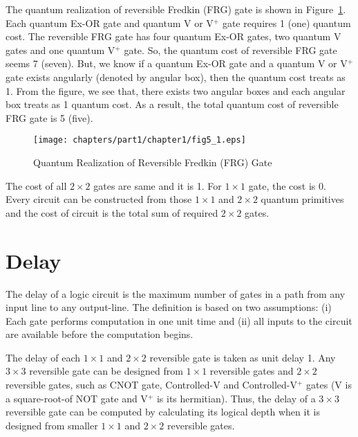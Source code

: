 \begin{example}\textnormal{
The quantum realization of reversible Fredkin (FRG) gate is shown in  Figure~\ref{fig:p1_c1_fig5_1}. Each quantum Ex-OR gate and quantum V or V$^+$ gate requires 1 (one) quantum cost. The reversible FRG gate has four quantum Ex-OR gates, two quantum V gates and one quantum V$^+$ gate. So, the quantum cost of reversible FRG gate seems 7 (seven). But, we know if a quantum Ex-OR gate and a quantum V or  V$^+$ gate exists angularly (denoted by angular  box), then the  quantum cost treats as 1. From the figure, we see that, there exists two angular boxes and each angular box treats as 1 quantum cost. As a result, the total quantum cost of reversible FRG gate is 5 (five).}
\end{example}

\begin{figure}[H]
	\centering
	\texttt{[image: chapters/part1/chapter1/fig5\_1.eps]}
	\caption{Quantum Realization of Reversible Fredkin (FRG) Gate}
	\label{fig:p1_c1_fig5_1}
\end{figure}
\begin{example}\textnormal{
	The cost of all $2 \times 2$ gates are same and it is 1. For $1 \times 1$ gate, the cost is 0. Every circuit can be constructed from those $1 \times 1$ and $2 \times 2$ quantum primitives and the cost of circuit is the total sum of required $2 \times 2$ gates.}
\end{example}
\section{Delay}
The delay of a logic circuit is the maximum number of gates in a path from any input line to any output-line. The definition is based on two assumptions: (i) Each gate performs computation in one unit time and (ii) all inputs to the circuit are available before the computation begins.


\begin{example}\textnormal{
	The delay of each $1 \times 1$ and $2 \times 2$ reversible gate is taken as unit delay 1. Any $3 \times 3$ reversible gate can be designed from $1 \times 1$ reversible gates and $2\times 2$ reversible gates, such as CNOT gate, Controlled-V and Controlled-V$^+$ gates (V is a square-root-of NOT gate and V$^+$ is its hermitian). Thus, the delay of a $3 \times 3$ reversible gate can be computed by calculating its logical depth when it is designed from smaller $1 \times 1$ and $2 \times 2$ reversible gates.}
\end{example}

